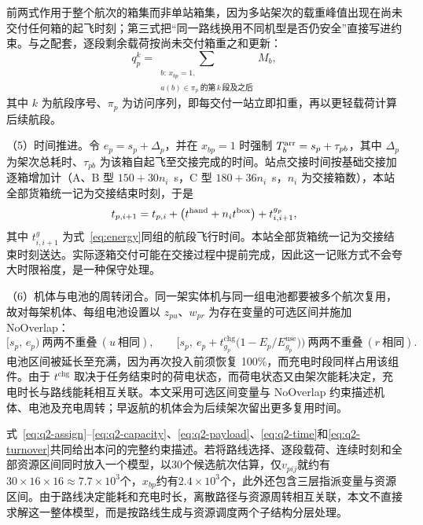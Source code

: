 前两式作用于整个航次的箱集而非单站箱集，因为多站架次的载重峰值出现在尚未交付任何箱的起飞时刻；第三式把“同一路线换用不同机型是否仍安全”直接写进约束。与之配套，逐段剩余载荷按尚未交付箱重之和更新：
\begin{equation}
q_p^{k}=\sum_{\substack{b:\,x_{bp}=1,\\ a(b)\in\pi_p\ \text{的第}\,k\,\text{段及之后}}}M_b,
\label{eq:q2-payload}
\end{equation}
其中 $k$ 为航段序号、$\pi_p$ 为访问序列，即每交付一站立即扣重，再以更轻载荷计算后续航段。

{\heiti（5）时间推进。}令 $e_p=s_p+\Delta_p$，并在 $x_{bp}=1$ 时强制 $T_b^{\rm arr}=s_p+\tau_{pb}$，其中 $\Delta_p$ 为架次总耗时、$\tau_{pb}$ 为该箱自起飞至交接完成的时间。站点交接时间按基础交接加逐箱增加计（A、B 型 $150+30n_i$~s，C 型 $180+36n_i$~s，$n_i$ 为交接箱数），本站全部货箱统一记为交接结束时刻，于是
\begin{equation}
t_{p,i+1}=t_{p,i}+\bigl(t^{\rm hand}+n_it^{\rm box}\bigr)+t^{g_p}_{i,i+1},
\label{eq:q2-time}
\end{equation}
其中 $t^{g}_{i,i+1}$ 为式~\eqref{eq:energy}同组的航段飞行时间。本站全部货箱统一记为交接结束时刻送达。实际逐箱交付可能在交接过程中提前完成，因此这一记账方式不会夸大时限裕度，是一种保守处理。

{\heiti（6）机体与电池的周转闭合。}同一架实体机与同一组电池都要被多个航次复用，故对每架机体、每组电池设置以 $z_{pu}$、$w_{pr}$ 为存在变量的可选区间并施加 NoOverlap：
\begin{equation}
[s_p,\,e_p)\ \text{两两不重叠}\ (u\ \text{相同}),\qquad
\bigl[s_p,\ e_p+t^{\mathrm{chg}}_{g_p}\bigl(1-E_p/E^{\mathrm{use}}_{g_p}\bigr)\bigr)\ \text{两两不重叠}\ (r\ \text{相同}).
\label{eq:q2-turnover}
\end{equation}
电池区间被延长至充满，因为再次投入前须恢复 100\%，而充电时段同样占用该组件。由于 $t^{\mathrm{chg}}$ 取决于任务结束时的荷电状态，而荷电状态又由架次能耗决定，充电时长与路线能耗相互关联。本文采用可选区间变量与 NoOverlap 约束描述机体、电池及充电周转；早返航的机体会为后续架次留出更多复用时间。

式~\eqref{eq:q2-assign}--\eqref{eq:q2-capacity}、\eqref{eq:q2-payload}、\eqref{eq:q2-time}和\eqref{eq:q2-turnover}共同给出本问的完整约束描述。若将路线选择、逐段载荷、连续时刻和全部资源区间同时放入一个模型，以30个候选航次估算，仅$v_{pij}$就约有$30\times16\times16\approx7.7\times10^3$个，$x_{bp}$约有$2.4\times10^3$个，此外还包含三层指派变量与资源区间。由于路线决定能耗和充电时长，离散路径与资源周转相互关联，本文不直接求解这一整体模型，而是按路线生成与资源调度两个子结构分层处理。

